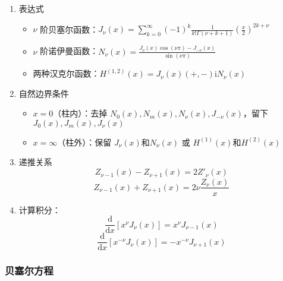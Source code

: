 \documentclass{article}
\begin{document}
\begin{enumerate}
    \item 表达式 \begin{itemize}
        \item $\nu$ 阶贝塞尔函数：$J_\nu(x)=\sum^\infty_{k=0}(-1)^k\frac{1}{k!\Gamma(\nu+k+1)}(\frac{x}{2})^{2k+\nu}$
        \item $\nu$ 阶诺伊曼函数：$N_\nu(x)=\frac{J_\nu(x)\cos(\nu\pi)-J_{-\nu}(x)}{\sin(\nu \pi)}$
        \item 两种汉克尔函数：$H^{(1, 2)}(x)=J_\nu(x)(+, -)\mathrm{i}N_\nu(x)$
    \end{itemize}
    \item 自然边界条件 \begin{itemize}
        \item $x=0$（柱内）：去掉 $N_0(x), N_m(x), N_\nu(x), J_{-\nu}(x)$，留下 $J_0(x), J_m(x), J_\nu(x)$
        \item $x=\infty$（柱外）：保留 $J_\nu(x)和N_\nu(x)$ 或 $H^{(1)}(x)和H^{(2)}(x)$
    \end{itemize}
    \item 递推关系 $$Z_{\nu-1}(x)-Z_{\nu+1}(x)=2Z'_\nu(x)$$ $$Z_{\nu-1}(x)+Z_{\nu+1}(x)=2\nu\frac{Z_\nu(x)}{x}$$
    \item 计算积分：$$\frac{\mathrm{d}}{\mathrm{d}x}[x^\nu J_\nu(x)]=x^\nu J_{\nu-1}(x)$$ $$\frac{\mathrm{d}}{\mathrm{d}x}[x^{-\nu}J_\nu(x)]=-x^{-\nu}J_{\nu+1}(x)$$
\end{enumerate}

\subsubsection{贝塞尔方程}
\end{document}
